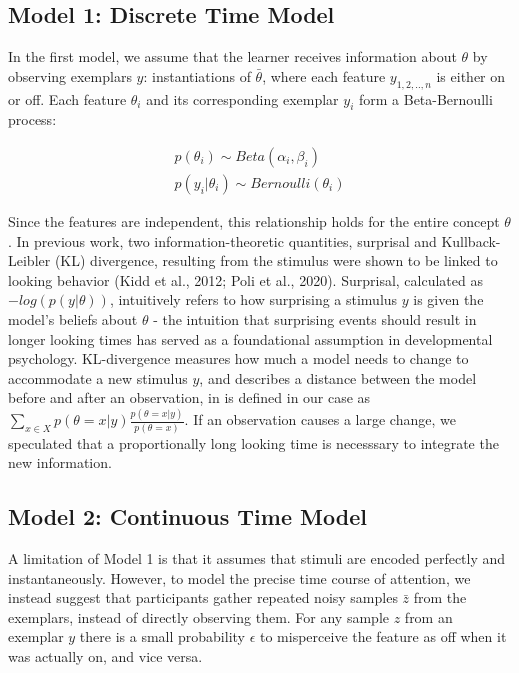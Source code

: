 \documentclass[10pt, letterpaper]{article}
\begin{document}
\hypertarget{model-1-discrete-time-model}{%
\subsection{Model 1: Discrete Time
Model}\label{model-1-discrete-time-model}}

In the first model, we assume that the learner receives information
about \(\theta\) by observing exemplars \(y\): instantiations of
\(\bar{\theta}\), where each feature \(y_{1,2,..,n}\) is either on or
off. Each feature \(\theta_i\) and its corresponding exemplar \(y_i\)
form a Beta-Bernoulli process:

\begin{eqnarray}
p(\theta_i) \sim Beta(\alpha_i,\beta_i) \\
p(y_i|\theta_i) \sim Bernoulli(\theta_i)
\end{eqnarray}

Since the features are independent, this relationship holds for the
entire concept \(\theta\). In previous work, two information-theoretic
quantities, surprisal and Kullback-Leibler (KL) divergence, resulting
from the stimulus were shown to be linked to looking behavior (Kidd et
al., 2012; Poli et al., 2020). Surprisal, calculated as
\(-log(p(y|\theta))\), intuitively refers to how surprising a stimulus
\(y\) is given the model's beliefs about \(\theta\) - the intuition that
surprising events should result in longer looking times has served as a
foundational assumption in developmental psychology. KL-divergence
measures how much a model needs to change to accommodate a new stimulus
\(y\), and describes a distance between the model before and after an
observation, in is defined in our case as
\(\sum_{x \in X}{p(\theta = x|y)\frac{p(\theta = x|y)}{p(\theta = x)}}\).
If an observation causes a large change, we speculated that a
proportionally long looking time is necesssary to integrate the new
information.

\hypertarget{model-2-continuous-time-model}{%
\subsection{Model 2: Continuous Time
Model}\label{model-2-continuous-time-model}}

A limitation of Model 1 is that it assumes that stimuli are encoded
perfectly and instantaneously. However, to model the precise time course
of attention, we instead suggest that participants gather repeated noisy
samples \(\bar{z}\) from the exemplars, instead of directly observing
them. For any sample \(z\) from an exemplar \(y\) there is a small
probability \(\epsilon\) to misperceive the feature as off when it was
actually on, and vice versa.
\end{document}
